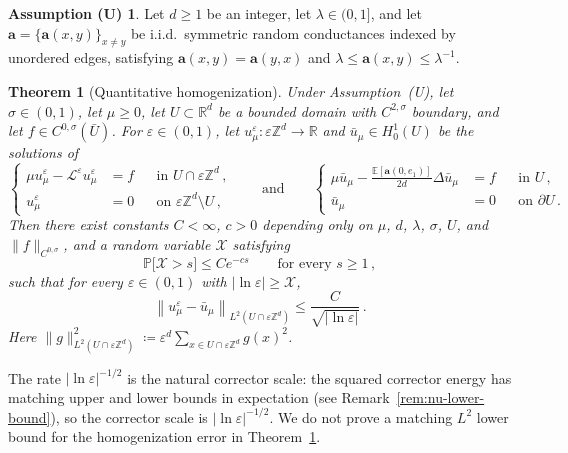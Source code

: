 \documentclass[11pt]{amsart}
\theoremstyle{plain}
\newtheorem{theorem}{Theorem}[section]
\theoremstyle{definition}
\newtheorem*{assumptionU}{Assumption \textup{(U)}}
\theoremstyle{remark}
\newcommand{\E}{\mathbb{E}}
\newcommand{\Zd}{\mathbb{Z}^d}
\newcommand{\Rd}{\mathbb{R}^d}
\newcommand{\R}{\mathbb{R}}
\renewcommand{\a}{\mathbf{a}}
\newcommand{\eps}{\varepsilon}
\renewcommand{\P}{\mathbb{P}}
\begin{document}
	\begin{assumptionU}\label{a.U}
		Let $d \ge 1$ be an integer, let $\lambda \in (0,1]$, and let $\a = \{\a(x,y)\}_{x \ne y}$ be i.i.d.\ symmetric random conductances indexed by unordered edges, satisfying $\a(x,y) = \a(y,x)$ and $\lambda \le \a(x,y) \le \lambda^{-1}$.
	\end{assumptionU}
	
	\begin{theorem}[Quantitative homogenization]
		\label{main.thm}
		Under Assumption~\textup{(U)}, let $\sigma \in (0,1)$, let $\mu \ge 0$, let $U \subset \Rd$ be a bounded domain with $C^{2,\sigma}$ boundary, and let $f \in C^{0,\sigma}(\bar U)$.
		For $\eps \in (0,1)$, let $u^\eps_\mu \colon \eps\Zd \to \R$ and $\bar u_\mu \in H^1_0(U)$ be the solutions of
		\begin{equation}
			\label{e.main.equations}
			\left\{
			\begin{aligned}
				\mu u^\eps_\mu - \mathcal{L}^\eps u^\eps_\mu &= f && \text{in } U \cap \eps\Zd\,, \\
				u^\eps_\mu &= 0 && \text{on } \eps\Zd \setminus U\,,
			\end{aligned}
			\right.
			\qquad \text{and} \qquad
			\left\{
			\begin{aligned}
				\mu \bar u_\mu - \frac{\E[\a(0,e_1)]}{2d} \Delta \bar u_\mu &= f && \text{in } U\,, \\
				\bar u_\mu &= 0 && \text{on } \partial U\,.
			\end{aligned}
			\right.
		\end{equation}
		Then there exist constants $C < \infty$, $c > 0$ depending only on $\mu$, $d$, $\lambda$, $\sigma$, $U$, and $\|f\|_{C^{0,\sigma}}$, and a random variable $\mathcal{X}$ satisfying
		\begin{equation}
			\label{e.minimal.scale}
			\P\bigl[\mathcal{X} > s\bigr] \le C e^{-c s}
			\qquad \text{for every } s \ge 1\,,
		\end{equation}
		such that for every $\eps \in (0,1)$ with $\left| \ln\eps \right| \ge \mathcal{X}$,
		\begin{equation}
			\label{e.quenched.rate}
			\left\| u^\eps_\mu - \bar u_\mu \right\|_{L^2(U \cap \eps\Zd)} \le \frac{C}{\sqrt{\left| \ln\eps \right|}}\,.
		\end{equation}
		Here $\|g\|_{L^2(U \cap \eps\Zd)}^2 \coloneqq \eps^d \sum_{x \in U \cap \eps\Zd} g(x)^2$.
	\end{theorem}
	The rate $\left|\ln\eps \right|^{-1/2}$ is the natural corrector scale: the squared corrector energy has matching upper and lower bounds in expectation (see Remark~\ref{rem:nu-lower-bound}), so the corrector scale is $\left|\ln\eps\right|^{-1/2}$. We do not prove a matching $L^2$ lower bound for the homogenization error in Theorem~\ref{main.thm}.
	
\end{document}
